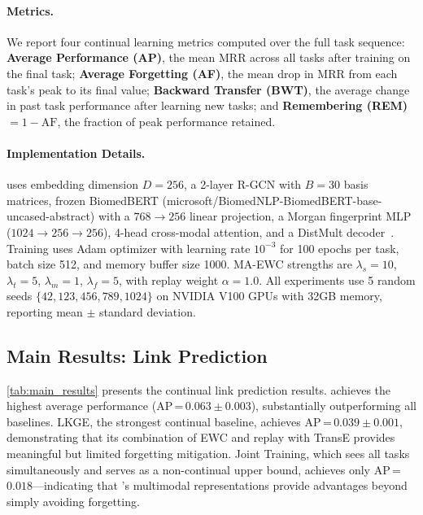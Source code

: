 \paragraph{Metrics.}
We report four continual learning metrics computed over the full task sequence:
\textbf{Average Performance (AP)}, the mean MRR across all tasks after training on the final task;
\textbf{Average Forgetting (AF)}, the mean drop in MRR from each task's peak to its final value;
\textbf{Backward Transfer (BWT)}, the average change in past task performance after learning new tasks; and
\textbf{Remembering (REM)} $= 1 - \text{AF}$, the fraction of peak performance retained.

\paragraph{Implementation Details.}
\ours uses embedding dimension $D{=}256$, a 2-layer R-GCN with $B{=}30$ basis matrices, frozen BiomedBERT (microsoft/BiomedNLP-BiomedBERT-base-uncased-abstract) with a $768 {\to} 256$ linear projection, a Morgan fingerprint MLP ($1024 {\to} 256 {\to} 256$), 4-head cross-modal attention, and a DistMult decoder~\citep{yang2015embedding}.
Training uses Adam optimizer with learning rate $10^{-3}$ for 100 epochs per task, batch size 512, and memory buffer size 1000.
MA-EWC strengths are $\lambda_s{=}10$, $\lambda_t{=}5$, $\lambda_m{=}1$, $\lambda_f{=}5$, with replay weight $\alpha{=}1.0$.
All experiments use 5 random seeds $\{42, 123, 456, 789, 1024\}$ on NVIDIA V100 GPUs with 32GB memory, reporting mean $\pm$ standard deviation.

\subsection{Main Results: Link Prediction}
\label{subsec:main_results}



\cref{tab:main_results} presents the continual link prediction results.
\ours achieves the highest average performance (AP\,=\,$0.063 \pm 0.003$), substantially outperforming all baselines.
LKGE, the strongest continual baseline, achieves AP\,=\,$0.039 \pm 0.001$, demonstrating that its combination of EWC and replay with TransE provides meaningful but limited forgetting mitigation.
Joint Training, which sees all tasks simultaneously and serves as a non-continual upper bound, achieves only AP\,=\,$0.018$---indicating that \ours's multimodal representations provide advantages beyond simply avoiding forgetting.

